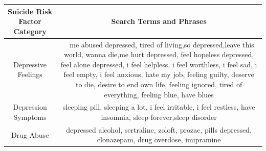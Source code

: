 \documentclass[11pt]{article}
\begin{document}
\begin{table}
    \centering
    \begin{tabulary}{500pt}{|C|C|}
    \hline
    \textbf{Suicide Risk Factor Category} & \textbf{Search Terms and Phrases} \\ \hline
    Depressive Feelings & ~  me abused depressed, tired of living,so depressed,leave this world, wanna die,me hurt depressed, feel hopeless depressed, feel alone depressed, i feel helpless, i feel worthless, i feel sad, i feel empty, i feel anxious, hate my job, feeling guilty, deserve to die, desire to end own life, feeling ignored, tired of everything, feeling blue, have blues                                                                                                                                                                                                                                                                                                                                                                                                                                                                         \\ \hline
    Depression Symptoms                   & sleeping pill, sleeping a lot, i feel irritable, i feel restless, have insomnia, sleep forever,sleep disorder                                                                                                                                                                                                                                                                                                                                                                                                                                                                                                                                                                                                                                                                                                                             \\ \hline
   Drug Abuse                            & depressed alcohol, sertraline, zoloft, prozac, pills depressed, clonazepam, drug overdose, imipramine                                                                                                                                                                                                                                                                                                                                                                                                                                                                                                                                                                                                                                                                                                                                     \\ \hline

\end{tabulary}
\end{table}
\end{document}
